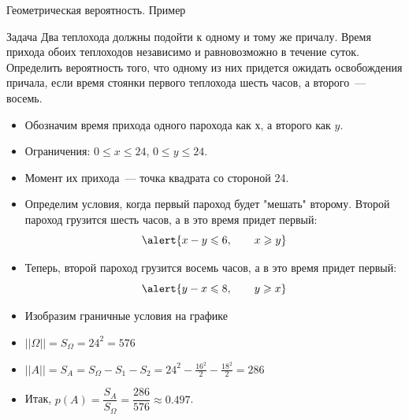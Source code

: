 \documentclass[unicode,11pt,notheorems,xcolor=table]{beamer}
\begin{document}
\begin{frame}[allowframebreaks]{Геометрическая вероятность. Пример}{}
    \begin{exampleblock}{Задача}
        Два теплохода должны подойти к одному и тому же причалу. Время прихода обоих теплоходов независимо и равновозможно в течение суток. Определить вероятность того, что одному из них придется ожидать освобождения причала, если время стоянки первого теплохода шесть часов, а второго~--- восемь.       
    \end{exampleblock}
    \begin{itemize}
        \item Обозначим время прихода одного парохода как $х$, а второго как $y$.
        \item Ограничения: \alert{$0 \leqslant x \leqslant 24$, $0 \leqslant y \leqslant 24$}.
        \item Момент их прихода~--- точка квадрата со стороной 24.
        \framebreak
        \item Определим условия, когда первый пароход будет "мешать" второму. 
        Второй пароход грузится шесть часов, а в это время придет первый:
        $$
            \alert{x - y \leqslant 6,\qquad x\geqslant y}
        $$
        \item Теперь, второй пароход грузится восемь часов, а в это время придет первый:
        $$
            \alert{y - x \leqslant 8,\qquad y\geqslant x}
        $$
        \item Изобразим граничные условия на графике
        \framebreak

        {\centering {}
        \par}
        \item \alert{$||\Omega|| = S_\Omega = 24^2=576$}
        \item \alert{$||A|| = S_A=S_\Omega-S_1-S_2=24^2-\frac{16^2}{2}-\frac{18^2}{2}=286$}
        \item Итак, \alert{$p(A)=\dfrac{S_A}{S_\Omega}=\dfrac{286}{576}\approx 0.497$}.
    \end{itemize}
\end{frame}
\end{document}
